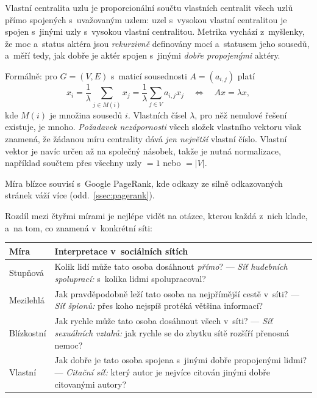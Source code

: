 \documentclass[11pt,a4paper]{article}
\theoremstyle{definition}
\begin{document}
\begin{defbox}
Vlastní centralita uzlu je proporcionální součtu vlastních centralit všech uzlů přímo
spojených s~uvažovaným uzlem:
uzel s~vysokou vlastní centralitou je spojen s~jinými uzly s~vysokou vlastní centralitou.
Metrika vychází z~myšlenky, že moc a~status aktéra jsou \emph{rekurzivně} definovány mocí
a~statusem jeho sousedů, a~měří tedy, jak dobře je aktér spojen s~jinými \emph{dobře
propojenými} aktéry.

Formálně: pro $G=(V,E)$ s~maticí sousednosti $A=(a_{i,j})$ platí
\[ x_i=\frac1\lambda\sum_{j\in M(i)}x_j=\frac1\lambda\sum_{j\in V}a_{i,j}x_j
   \quad\Longleftrightarrow\quad Ax=\lambda x, \]
kde $M(i)$ je množina sousedů $i$. Vlastních čísel $\lambda$, pro něž nenulové řešení
existuje, je mnoho. \emph{Požadavek nezápornosti} všech složek vlastního vektoru však
znamená, že žádanou míru centrality dává \emph{jen největší} vlastní číslo. Vlastní vektor
je navíc určen až na společný násobek, takže je nutná normalizace, například součtem přes
všechny uzly $=1$ nebo $=|V|$.

Míra blízce souvisí s~Google PageRank, kde odkazy ze silně odkazovaných stránek váží více
(odd.~\ref{ssec:pagerank}).
\end{defbox}

Rozdíl mezi čtyřmi mírami je nejlépe vidět na otázce, kterou každá z~nich klade, a~na tom, co
znamená v~konkrétní síti:

\begin{center}
\small
\begin{tabular}{@{}p{2.7cm}p{12.6cm}@{}}
\toprule
\textbf{Míra} & \textbf{Interpretace v~sociálních sítích} \\
\midrule
Stupňová & Kolik lidí může tato osoba dosáhnout \emph{přímo}? --- \emph{Síť hudebních
  spoluprací:} s~kolika lidmi spolupracoval? \\
Mezilehlá & Jak pravděpodobně leží tato osoba na nejpřímější cestě v~síti? --- \emph{Síť
  špionů:} přes koho nejspíš protéká většina informací? \\
Blízkostní & Jak rychle může tato osoba dosáhnout všech v~síti? --- \emph{Síť sexuálních
  vztahů:} jak rychle se do zbytku sítě rozšíří přenosná nemoc? \\
Vlastní & Jak dobře je tato osoba spojena s~jinými dobře propojenými lidmi? --- \emph{Citační
  síť:} který autor je nejvíce citován jinými dobře citovanými autory? \\
\bottomrule
\end{tabular}
\end{center}
\end{document}
